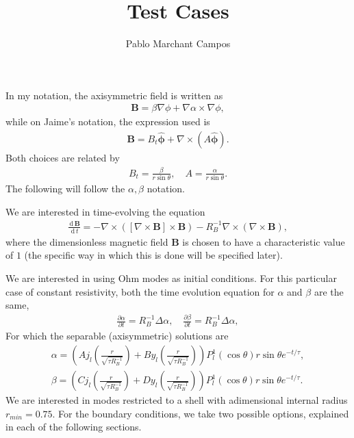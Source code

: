 \documentclass[letterpaper,10pt]{article}
\title{Test Cases}
\author{Pablo Marchant Campos}
\newcommand{\dd}{\,\mathrm{d}\,}
\newcommand{\pp}{\partial}
\renewcommand{\vec}[1]{\boldsymbol#1}
\newcommand{\bhat}[1]{\hat{\boldsymbol#1}}
\begin{document}
\maketitle

In my notation, the axisymmetric field is written as
\begin{eqnarray}
\vec{B}=\beta\nabla\phi+\nabla\alpha\times\nabla\phi,
\end{eqnarray}
while on Jaime's notation, the expression used is
\begin{eqnarray}
\vec{B}=B_t\bhat{\phi}+\nabla\times(A\bhat{\phi}).
\end{eqnarray}
Both choices are related by
\begin{eqnarray}
B_t=\frac{\beta}{r\sin\theta},\quad A=\frac{\alpha}{r\sin\theta}.
\end{eqnarray}
The following will follow the $\alpha,\beta$ notation.

We are interested in time-evolving the equation
\begin{eqnarray}
\frac{\dd \vec{B}}{\dd t}=-\nabla\times\left([\nabla\times\vec{B}]\times\vec{B}\right)-R_B^{-1}\nabla\times\left(\nabla\times\vec{B}\right),
\end{eqnarray}
where the dimensionless magnetic field $\vec{B}$ is chosen to have a characteristic value of $1$ (the specific way in which this is done will be specified later).

We are interested in using Ohm modes as initial conditions. For this particular case of constant resistivity, both the time evolution equation for $\alpha$ and $\beta$ are the same,
\begin{eqnarray}
\frac{\pp \alpha}{\pp t}=R_B^{-1}\Delta\alpha,\quad \frac{\pp \beta}{\pp t}=R_B^{-1}\Delta\alpha,
\end{eqnarray}
For which the separable (axisymmetric) solutions are
\begin{eqnarray}
\alpha=\left(Aj_l\left(\frac{r}{\sqrt{\tau R_B^{-1}}}\right)+By_l\left(\frac{r}{\sqrt{\tau R_B^{-1}}}\right)\right)P_l^1(\cos\theta)r\sin\theta e^{-t/\tau},\\
\beta=\left(Cj_l\left(\frac{r}{\sqrt{\tau R_B^{-1}}}\right)+Dy_l\left(\frac{r}{\sqrt{\tau R_B^{-1}}}\right)\right)P_l^1(\cos\theta)r\sin\theta e^{-t/\tau}.
\end{eqnarray}
We are interested in modes restricted to a shell with adimensional internal radius $r_{min}=0.75$. For the boundary conditions, we take two possible options, explained in each of the following sections.
\end{document}
